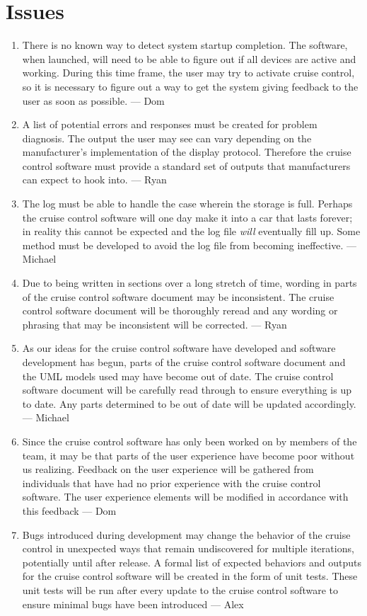 \documentclass{article}
\begin{document}
	\section{Issues}
	\begin{enumerate}
		\item There is no known way to detect system startup completion. The software, when launched, will need to be able to figure out if all devices are active and working. During this time frame, the user may try to activate cruise control, so it is necessary to figure out a way to get the system giving feedback to the user as soon as possible. --- Dom
		
		\item A list of potential errors and responses must be created for problem diagnosis. The output the user may see can vary depending on the manufacturer's implementation of the display protocol. Therefore the cruise control software must provide a standard set of outputs that manufacturers can expect to hook into. --- Ryan
		
		\item The log must be able to handle the case wherein the storage is full. Perhaps the cruise control software will one day make it into a car that lasts forever; in reality this cannot be expected and the log file \textit{will} eventually fill up. Some method must be developed to avoid the log file from becoming ineffective. --- Michael
		
		\item Due to being written in sections over a long stretch of time, wording in parts of the cruise control software document may be inconsistent. The cruise control software document will be thoroughly reread and any wording or phrasing that may be inconsistent will be corrected. --- Ryan
		
		\item As our ideas for the cruise control software have developed and software development has begun, parts of the cruise control software document and the UML models used may have become out of date. The cruise control software document will be carefully read through to ensure everything is up to date. Any parts determined to be out of date will be updated accordingly. --- Michael
		
		\item Since the cruise control software has only been worked on by members of the team, it may be that parts of the user experience have become poor without us realizing. Feedback on the user experience will be gathered from individuals that have had no prior experience with the cruise control software. The user experience elements will be modified in accordance with this feedback --- Dom

		\item Bugs introduced during development may change the behavior of the cruise control in unexpected ways that remain undiscovered for multiple iterations, potentially until after release. A formal list of expected behaviors and outputs for the cruise control software will be created in the form of unit tests. These unit tests will be run after every update to the cruise control software to ensure minimal bugs have been introduced --- Alex
	\end{enumerate}
	
\end{document}
